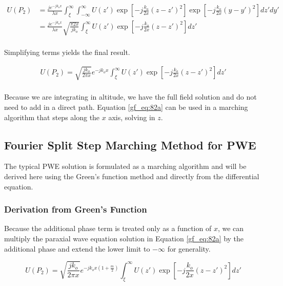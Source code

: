 \begin{equation}
\begin{aligned}
U(P_2) &=\frac{je^{-jk_ox}}{\lambda x}\int_{\xi}^{\infty}\int_{-\infty}^{\infty} U(z') \exp\left[-j \frac{k_o}{2x}\left(z-z'\right)^2 \right]   \exp\left[-j \frac{k_o}{2x}\left(y-y'\right)^2 \right]dz' dy' \\
&=\frac{je^{-jk_ox}}{\lambda x}\sqrt{\frac{\pi 2 x}{jk_o}}\int_{\xi}^{\infty}U(z') \exp\left[-j \frac{k_o}{2x}\left(z-z'\right)^2 \right]dz'\\
\end{aligned}
\label{gf_eq:82}
\end{equation}
\renewcommand{\baselinestretch}{2} \small\normalsize

\noindent Simplifying terms yields the final result.

\begin{equation}
\begin{aligned}
\boxed{U(P_2) =\sqrt{\frac{jk_o}{2\pi x}}e^{-jk_ox}\int_{\xi}^{\infty}U(z') \exp\left[-j \frac{k_o}{2x}\left(z-z'\right)^2 \right]dz'}\\
\end{aligned}
\label{gf_eq:82a}
\end{equation}
\renewcommand{\baselinestretch}{2} \small\normalsize

Because we are integrating in altitude, we have the full field solution and do not need to add in a direct path. Equation \ref{gf_eq:82a} can be used in a marching algorithm that steps along the $x$ axis, solving in $z$.

\subsection{Fourier Split Step Marching Method for PWE}
The typical PWE solution is formulated as a marching algorithm and will be derived here using the Green's function method and directly from the differential equation. 

\subsubsection{Derivation from Green's Function}
Because the additional phase term is treated only as a function of $x$, we can multiply the paraxial wave equation solution in Equation \ref{gf_eq:82a} by the additional phase and extend the lower limit to $-\infty$ for generality.

\begin{equation}
U(P_2) =\sqrt{\frac{jk_o}{2\pi x}}e^{-jk_ox\left(1+\frac{m}{2}\right)}\int_{\xi}^{\infty}U(z') \exp\left[-j \frac{k_o}{2x}\left(z-z'\right)^2 \right]dz'
\label{gf_eq:301}
\end{equation}
\renewcommand{\baselinestretch}{2} \small\normalsize

